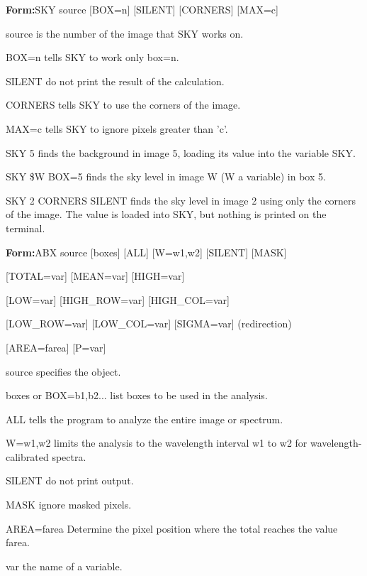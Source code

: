 {\newpage\clearpage
{}%
\begin{command}
  \item[\textbf{Form:}SKY source {[BOX=n]} {[SILENT]} {[CORNERS]}
       {[MAX=c]}\hfill]{}
  \item[source]{is the number of the image that SKY works on.}
  \item[BOX=n]{tells SKY to work only box=n.}
  \item[SILENT]{do not print the result of the calculation.}
  \item[CORNERS]{tells SKY to use the corners of the image.}
  \item[MAX=c]{tells SKY to ignore pixels greater than 'c'.}
\end{command}%
\lthtmlfigureZ
\lthtmlcheckvsize\clearpage}

{\newpage\clearpage
{}%
\begin{example}
  \item[SKY 5\hfill]{ finds the background in image 5, loading 
  its value into the variable SKY.}
  \item[SKY \$W BOX=5\hfill]{finds the sky level in image W
  (W a variable) in box 5.}
  \item[SKY 2 CORNERS SILENT\hfill]{finds the sky level in image 2 using
  only the corners of the image.  The value is loaded into SKY, but nothing
  is printed on the terminal.}
\end{example}%
\lthtmlfigureZ
\lthtmlcheckvsize\clearpage}

{\newpage\clearpage
{}%
\begin{command}
  \item[\textbf{Form:}ABX source {[boxes]} {[ALL]} {[W=w1,w2]} {[SILENT]} 
       {[MASK]}\hfill]{}
  \item{{[TOTAL=var]} {[MEAN=var]} {[HIGH=var]}}
  \item{{[LOW=var]} {[HIGH\_ROW=var]} {[HIGH\_COL=var]}}
  \item{{[LOW\_ROW=var]} {[LOW\_COL=var]} {[SIGMA=var]} (redirection)}
  \item{{[AREA=farea]} {[P=var]}}
  \item[source]{specifies the object.}
  \item[boxes or BOX=b1,b2...]{list boxes to be used in the analysis.}
  \item[ALL]{tells the program to analyze the entire image or spectrum.}
  \item[W=w1,w2]{limits the analysis to the wavelength interval w1 to w2 for 
       wavelength-calibrated spectra.}
  \item[SILENT]{do not print output.} 
  \item[MASK]{ignore masked pixels.}
  \item[AREA=farea]{Determine the pixel position where the total reaches
       the value farea.}
  \item[var]{the name of a variable.}
\end{command}%
\lthtmlfigureZ
\lthtmlcheckvsize\clearpage}

